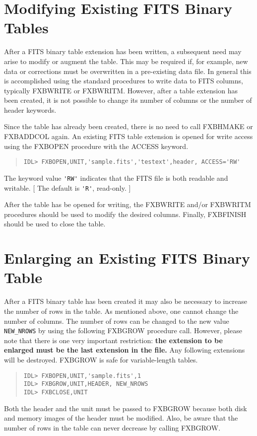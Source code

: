 \section{Modifying Existing FITS Binary Tables}

After a FITS binary table extension has been written, a subsequent
need may arise to modify or augment the table.  This may be required
if, for example, new data or corrections must be overwritten in a
pre-existing data file.  In general this is accomplished using the
standard procedures to write data to FITS columns, typically FXBWRITE
or FXBWRITM.  However, after a table extension has been created, it is
not possible to change its number of columns or the number of header
keywords.

Since the table has already been created, there is no need to call
FXBHMAKE or FXBADDCOL again.  An existing FITS table extension is
opened for write access using the FXBOPEN procedure with the ACCESS
keyword.
%
\begin{quote}
\begin{verbatim}
IDL> FXBOPEN,UNIT,'sample.fits','testext',header, ACCESS='RW'
\end{verbatim}
\end{quote}
%
The keyword value \verb|'RW'| indicates that the FITS file is both
readable and writable.  [ The default is \verb|'R'|, read-only. ]

After the table has be opened for writing, the FXBWRITE and/or
FXBWRITM procedures should be used to modify the desired columns.
Finally, FXBFINISH should be used to close the table.

\section{Enlarging an Existing FITS Binary Table}

After a FITS binary table has been created it may also be necessary to
increase the number of rows in the table.  As mentioned above, one
cannot change the number of columns.  The number of rows can be
changed to the new value \verb|NEW_NROWS| by using the following
FXBGROW procedure call.  However, please note that there is one very
important restriction: {\bf the extension to be enlarged must be the
last extension in the file.}  Any following extensions will be
destroyed.  FXBGROW is safe for variable-length tables.
%
\begin{quote}
\begin{verbatim}
IDL> FXBOPEN,UNIT,'sample.fits',1
IDL> FXBGROW,UNIT,HEADER, NEW_NROWS
IDL> FXBCLOSE,UNIT
\end{verbatim}
\end{quote}
%
Both the header and the unit must be passed to FXBGROW because both
disk and memory images of the header must be modified.  Also, be aware
that the number of rows in the table can never decrease by calling
FXBGROW.

